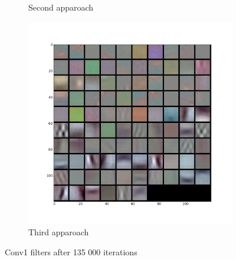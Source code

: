 \begin{figure}[ht]
\begin{subfigure}{0.33\textwidth}
\caption{Second apparoach}
\end{subfigure}%
\begin{subfigure}{0.33\textwidth}
\centering
\includegraphics[width=0.9\linewidth]{images/regression/conv1_30_135000.png}
\caption{Third apparoach}
\end{subfigure}
\caption{Conv1 filters after 135 000 iterations}
\end{figure}
